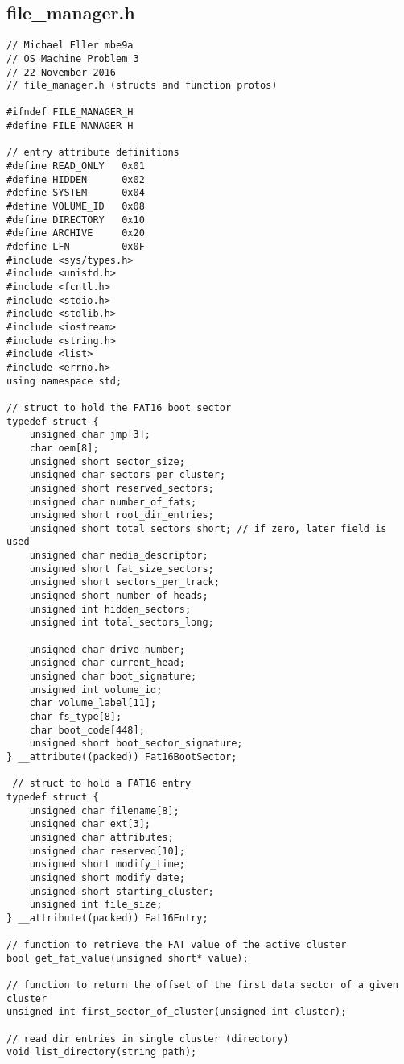 \documentclass[12pt,letter,titlepage]{article}
\begin{document}
\subsection*{file\_manager.h}{
\scriptsize{
\begin{verbatim}
// Michael Eller mbe9a
// OS Machine Problem 3
// 22 November 2016
// file_manager.h (structs and function protos)

#ifndef FILE_MANAGER_H
#define FILE_MANAGER_H

// entry attribute definitions
#define READ_ONLY	0x01
#define HIDDEN 		0x02
#define SYSTEM 		0x04
#define VOLUME_ID 	0x08
#define DIRECTORY 	0x10
#define ARCHIVE		0x20
#define LFN			0x0F
#include <sys/types.h>
#include <unistd.h>
#include <fcntl.h>
#include <stdio.h>
#include <stdlib.h>
#include <iostream>
#include <string.h>
#include <list>
#include <errno.h>
using namespace std;

// struct to hold the FAT16 boot sector
typedef struct {
    unsigned char jmp[3];
    char oem[8];
    unsigned short sector_size;
    unsigned char sectors_per_cluster;
    unsigned short reserved_sectors;
    unsigned char number_of_fats;
    unsigned short root_dir_entries;
    unsigned short total_sectors_short; // if zero, later field is used
    unsigned char media_descriptor;
    unsigned short fat_size_sectors;
    unsigned short sectors_per_track;
    unsigned short number_of_heads;
    unsigned int hidden_sectors;
    unsigned int total_sectors_long;
    
    unsigned char drive_number;
    unsigned char current_head;
    unsigned char boot_signature;
    unsigned int volume_id;
    char volume_label[11];
    char fs_type[8];
    char boot_code[448];
    unsigned short boot_sector_signature;
} __attribute((packed)) Fat16BootSector;
 
 // struct to hold a FAT16 entry
typedef struct {
    unsigned char filename[8];
    unsigned char ext[3];
    unsigned char attributes;
    unsigned char reserved[10];
    unsigned short modify_time;
    unsigned short modify_date;
    unsigned short starting_cluster;
    unsigned int file_size;
} __attribute((packed)) Fat16Entry;

// function to retrieve the FAT value of the active cluster
bool get_fat_value(unsigned short* value);

// function to return the offset of the first data sector of a given cluster
unsigned int first_sector_of_cluster(unsigned int cluster);

// read dir entries in single cluster (directory)
void list_directory(string path);


\end{verbatim}}}
\end{document}
